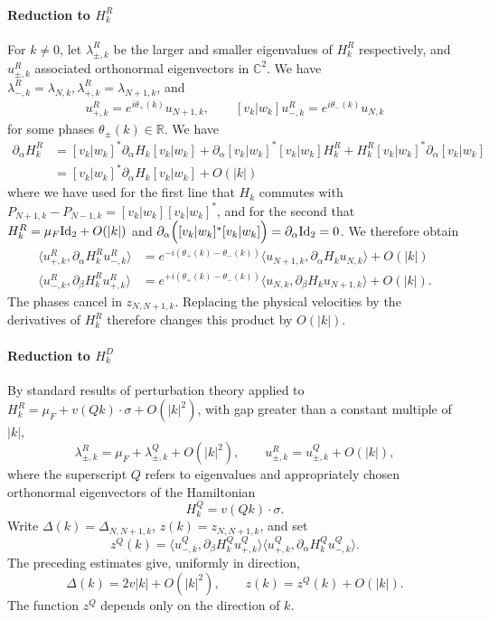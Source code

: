 \documentclass[a4paper,11pt]{article}
\theoremstyle{plain}
\theoremstyle{remark}
\def\R{{\mathbb R}}
\def\C{{\mathbb C}}
\begin{document}
\paragraph{Reduction to $H_k^{R}$}
For $k \neq 0$, let $\lambda^{R}_{\pm,k}$ be the larger and smaller
eigenvalues of $H_k^{R}$ respectively, and $u^{R}_{\pm,k}$
associated orthonormal eigenvectors in $\C^2$. We have
$\lambda_{-,k}^{R} = \lambda_{N,k}, \lambda_{+,k}^{R} =
\lambda_{N+1,k}$, and
\begin{align*}
  [v_{k} | w_{k}]
u_{+,k}^{R} = e^{i\theta_{+}(k)}u_{N + 1,k},\qquad[v_{k} | w_{k}]
u_{-,k}^{R} = e^{i\theta_{-}(k)}u_{N,k}
\end{align*}
for some phases $\theta_{\pm}(k) \in \R$. We have
\begin{align*}
  \partial_\alpha H_k^{R}
  &= [v_{k} | w_{k}]^{*}
\partial_\alpha H_k[v_{k} | w_{k}]+ \partial_\alpha [v_{k} | w_{k}]^{*} [v_{k} | w_{k}] H_k^{R} + H_k^{R}  [v_{k} | w_{k}]^{*}\partial_\alpha [v_{k} | w_{k}]
\\
&= [v_{k} | w_{k}]^{*}
\partial_\alpha H_k[v_{k} | w_{k}] + O(|k|)
\end{align*}
where we have used for the first line that $H_k$ commutes with
$P_{N+1,k} - P_{N-1,k} = [v_{k} | w_{k}]
[v_{k} | w_{k}]^{*}$, and for the second that $H_k^{R} = \mu_{F} {\rm Id}_{2} + O(|k|)$ and
$\partial_\alpha \Big([v_{k} | w_{k}]^{*} [v_{k} | w_{k}] \Big) =
\partial_\alpha {\rm Id}_{2} = 0$. We therefore obtain
\begin{align*}
  \langle u^{R}_{+,k},\partial_\alpha H_k^{R}u^{R}_{-,k}\rangle&= e^{-i(\theta_{+}(k)-\theta_{-}(k))}\langle u_{N+1,k},\partial_\alpha H_ku_{N,k}\rangle + O(|k|)\\
  \langle u^{R}_{-,k}, \partial_\beta H_k^{R} u^{R}_{+,k} \rangle&= e^{+i(\theta_{+}(k)-\theta_{-}(k))}\langle u_{N,k},\partial_\beta H_ku_{N+1,k}\rangle + O(|k|).
\end{align*}
The phases cancel in $z_{N,N+1,k}$. Replacing the physical velocities
by the derivatives of $H_k^R$ therefore changes this product by $O(|k|)$.

\paragraph{Reduction to $H_k^D$}
By standard results of perturbation theory \cite[Chapter XII]{ReedSimon4}
applied to $H_k^R=\mu_F+v(Qk)\cdot\sigma+O(|k|^2)$, with gap
greater than a constant multiple of $|k|$,
\[
\lambda^R_{\pm,k}=\mu_F+\lambda^Q_{\pm,k}+O(|k|^2),
\qquad u^R_{\pm,k}=u^Q_{\pm,k}+O(|k|),
\]
where the superscript $Q$ refers to eigenvalues and appropriately
chosen orthonormal eigenvectors of the Hamiltonian
\[
H_k^Q=v(Qk)\cdot\sigma.
\]
Write $\Delta(k)=\Delta_{N,N+1,k}$, $z(k)=z_{N,N+1,k}$, and set
\[
z^Q(k)=\langle u^Q_{-,k},\partial_\beta H_k^Q u^Q_{+,k}\rangle
\langle u^Q_{+,k},\partial_\alpha H_k^Q u^Q_{-,k}\rangle.
\]
The preceding estimates give, uniformly in direction,
\[
\Delta(k)=2v|k|+O(|k|^2),\qquad z(k)=z^Q(k)+O(|k|).
\]
The function $z^Q$ depends only on the direction of $k$.
\end{document}
